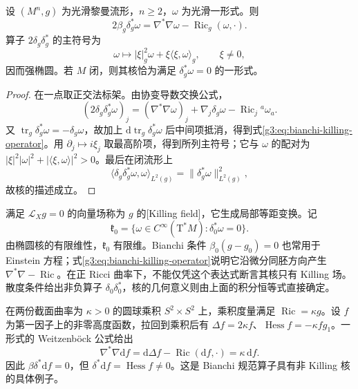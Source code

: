 \begin{proposition}\label{g3:prop:bianchi-gauge-symbol}
	设 \((M^n,g)\) 为光滑黎曼流形，\(n\ge2\)，\(\omega\) 为光滑一形式。则
	\begin{equation}\label{g3:eq:bianchi-killing-operator}
		2\beta_g\delta_g^*\omega
		=\nabla^*\nabla\omega-\operatorname{Ric}_g(\omega,\cdot).
	\end{equation}
	算子 \(2\delta_g\delta_g^*\) 的主符号为
	\[
		\omega\longmapsto |\xi|_g^2\omega+\xi\langle\xi,\omega\rangle_g,
		\qquad \xi\ne0,
	\]
	因而强椭圆。若 \(M\) 闭，则其核恰为满足 \(\delta_g^*\omega=0\) 的一形式。
\end{proposition}
\begin{proof}
	在一点取正交法标架。由协变导数交换公式，
	\[
		(2\delta_g\delta_g^*\omega)_j
		=(\nabla^*\nabla\omega)_j+\nabla_j\delta_g\omega
		-\operatorname{Ric}_j{}^a\omega_a.
	\]
	又 \(\operatorname{tr}_g\delta_g^*\omega=-\delta_g\omega\)，故加上 \(\mathrm d\operatorname{tr}_g\delta_g^*\omega\) 后中间项抵消，得到式\eqref{g3:eq:bianchi-killing-operator}。用 \(\partial_j\mapsto i\xi_j\) 取最高阶项，得到所列主符号；它与 \(\omega\) 的配对为 \(|\xi|^2|\omega|^2+|\langle\xi,\omega\rangle|^2>0\)。最后在闭流形上
	\[
		\langle\delta_g\delta_g^*\omega,\omega\rangle_{L^2(g)}
		=\|\delta_g^*\omega\|_{L^2(g)}^2,
	\]
	故核的描述成立。
\end{proof}

满足 \(\mathcal L_Xg=0\) 的向量场称为 \(g\) 的[Killing field]，它生成局部等距变换。记
\[
	\mathfrak k_0=\{\omega\in C^\infty(\mathrm T^*M):\delta_0^*\omega=0\}.
\]
由椭圆核的有限维性，\(\mathfrak k_0\) 有限维。Bianchi 条件 \(\beta_0(g-g_0)=0\) 也常用于 Einstein 方程；式\eqref{g3:eq:bianchi-killing-operator}说明它沿微分同胚方向产生 \(\nabla^*\nabla-\operatorname{Ric}\)。在正 Ricci 曲率下，不能仅凭这个表达式断言其核只有 Killing 场。散度条件给出非负算子 \(\delta_0\delta_0^*\)，核的几何意义则由上面的积分恒等式直接确定。

\begin{example}\label{g3:exm:bianchi-nonkilling-kernel}
	在两份截面曲率为 \(\kappa>0\) 的圆球乘积 \(S^2\times S^2\) 上，乘积度量满足 \(\operatorname{Ric}=\kappa g\)。设 \(f\) 为第一因子上的非零高度函数，拉回到乘积后有 \(\Delta f=2\kappa f\)、\(\operatorname{Hess}f=-\kappa f g_1\)。一形式的 Weitzenböck 公式给出
	\[
		\nabla^*\nabla\mathrm df
		=\mathrm d\Delta f-\operatorname{Ric}(\mathrm df,\cdot)
		=\kappa\,\mathrm df.
	\]
	因此 \(\beta\delta^*\mathrm df=0\)，但 \(\delta^*\mathrm df=\operatorname{Hess}f\ne0\)。这是 Bianchi 规范算子具有非 Killing 核的具体例子。
\end{example}

